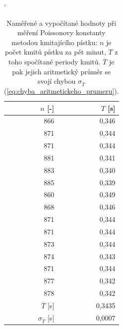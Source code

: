 \documentclass[english]{article}
\begin{document}
\begin{table}[htbp]
\catcode` %
  \centering
    \begin{tabular}{|r|r|}
    \hline
    $n$ [-] & $T$ [s] \bigstrut\\
    \hline
    866   & 0,346 \bigstrut\\
    \hline
    871   & 0,344 \bigstrut\\
    \hline
    871   & 0,344 \bigstrut\\
    \hline
    881   & 0,341 \bigstrut\\
    \hline
    883   & 0,340 \bigstrut\\
    \hline
    885   & 0,339 \bigstrut\\
    \hline
    860   & 0,349 \bigstrut\\
    \hline
    868   & 0,346 \bigstrut\\
    \hline
    871   & 0,344 \bigstrut\\
    \hline
    871   & 0,344 \bigstrut\\
    \hline
    873   & 0,344 \bigstrut\\
    \hline
    874   & 0,343 \bigstrut\\
    \hline
    871   & 0,344 \bigstrut\\
    \hline
    877   & 0,342 \bigstrut\\
    \hline
    878   & 0,342 \bigstrut\\
    \hline\hline
    $\overline{T}$ [s] & 0,3435 \bigstrut\\
    \hline
    $\sigma_{\overline{T}}$ [s] & 0,0007 \bigstrut\\
    \hline
    \end{tabular}%

\caption{ Naměřené a vypočítané hodnoty při měření Poissonovy konstanty metodou kmitajícího pístku: $n$ je počet kmitů pístku za pět minut, $T$ z toho spočítané periody kmitů.  $\overline{T}$ je pak jejich aritmetický průměr se svojí chybou $\sigma_{\overline{T}}$ (\ref{eq:chyba_aritmetickeho_prumeru}).  } \label{tab:pistek}%
\end{table}%

%
%
	
\end{document}
